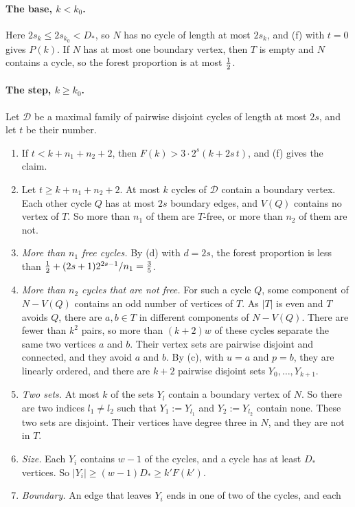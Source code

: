 \documentclass[11pt]{article}
\begin{document}
\paragraph{The base, $k<k_0$.} Here $2s_k\le2s_{k_0}<D_*$, so $N$ has no cycle of length at most
$2s_k$, and (f) with $t=0$ gives $P(k)$. If $N$ has at most one boundary vertex, then $T$ is
empty and $N$ contains a cycle, so the forest proportion is at most $\tfrac12$.

\paragraph{The step, $k\ge k_0$.} Let $\mathcal D$ be a maximal family of pairwise disjoint
cycles of length at most $2s$, and let $t$ be their number.
\begin{enumerate}[leftmargin=2.1em]
\item[(1)] If $t<k+n_1+n_2+2$, then $F(k)>3\cdot2^{s}(k+2s\,t)$, and (f) gives the claim.
\item[(2)] Let $t\ge k+n_1+n_2+2$. At most $k$ cycles of $\mathcal D$ contain a boundary vertex.
Each other cycle $Q$ has at most $2s$ boundary edges, and $V(Q)$ contains no vertex of $T$. So
more than $n_1$ of them are $T$-free, or more than $n_2$ of them are not.
\item[(3)] \emph{More than $n_1$ free cycles.} By (d) with $d=2s$, the forest proportion is less
than $\tfrac12+(2s+1)2^{2s-1}/n_1=\frac35$.
\item[(4)] \emph{More than $n_2$ cycles that are not free.} For such a cycle $Q$, some component
of $N-V(Q)$ contains an odd number of vertices of $T$. As $|T|$ is even and $T$ avoids $Q$, there
are $a,b\in T$ in different components of $N-V(Q)$. There are fewer than $k^{2}$ pairs, so more
than $(k+2)w$ of these cycles separate the same two vertices $a$ and $b$. Their vertex sets are
pairwise disjoint and connected, and they avoid $a$ and $b$. By (c), with $u=a$ and $p=b$, they
are linearly ordered, and there are $k+2$ pairwise disjoint sets $Y_0,\dots,Y_{k+1}$.
\item[(5)] \emph{Two sets.} At most $k$ of the sets $Y_l$ contain a boundary vertex of $N$. So
there are two indices $l_1\ne l_2$ such that $Y_1:=Y_{l_1}$ and $Y_2:=Y_{l_2}$ contain none. These
two sets are disjoint. Their vertices have degree three in $N$, and they are not in $T$.
\item[(6)] \emph{Size.} Each $Y_i$ contains $w-1$ of the cycles, and a cycle has at least $D_*$
vertices. So $|Y_i|\ge(w-1)D_*\ge k'F(k')$.
\item[(7)] \emph{Boundary.} An edge that leaves $Y_i$ ends in one of two of the cycles, and each

\end{enumerate}
\end{document}
